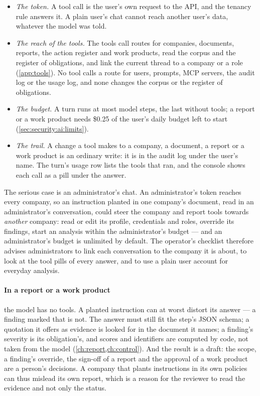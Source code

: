 \begin{itemize}
  \item \emph{The token.} A tool call is the user's own request to the API, and the tenancy
    rule answers it. A plain user's chat cannot reach another user's data, whatever the model
    was told.
  \item \emph{The reach of the tools.} The tools call routes for companies, documents,
    reports, the action register and work products, read the corpus and the register of
    obligations, and link the current thread to a company or a role (\cref{app:tools}). No
    tool calls a route for users, prompts, MCP servers, the audit log or the usage log, and
    none changes the corpus or the register of obligations.
  \item \emph{The budget.} A turn runs at most  \code{=}  model steps, the last
    without tools; a report or a work product needs \$0.25 of the user's daily budget left to
    start (\cref{sec:security:ai:limits}).
  \item \emph{The trail.} A change a tool makes to a company, a document, a report or a
    work product is an ordinary write: it is in the audit log under the user's name. The
    turn's usage row lists the tools that ran, and the console shows each call as a pill
    under the answer.
\end{itemize}

The serious case is an administrator's chat. An administrator's token reaches every company,
so an instruction planted in one company's document, read in an administrator's
conversation, could steer the company and report tools towards \emph{another} company:
read or edit its profile, credentials and roles, override its findings, start an analysis
within the administrator's budget --- and an administrator's budget is unlimited by default.
The operator's checklist therefore advises administrators to link each conversation to the
company it is about, to look at the tool pills of every answer, and to use a plain user
account for everyday analysis.

\paragraph{In a report or a work product} the model has no tools. A planted instruction can
at worst distort its answer --- a finding marked  that is not. The answer must
still fit the step's JSON schema; a quotation it offers as evidence is looked for in the
document it names; a finding's severity is its obligation's, and scores and identifiers are
computed by code, not taken from the model (\cref{ch:report,ch:control}). And the result is a draft: the scope,
a finding's override, the sign-off of a report and the approval of a work product are a
person's decisions. A company that plants instructions in its own policies can thus mislead
its own report, which is a reason for the reviewer to read the evidence and not only the
status.

